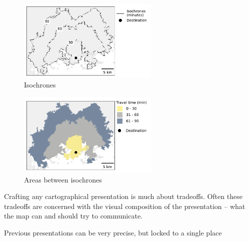 
\begin{figure}[H]
	\centering
	\includegraphics[width=0.6\textwidth]{visual/figures/ttm/isochrone_lines.pdf}
	\caption{Isochrones}
	\label{fig:isochrone lines}
\end{figure}

\begin{figure}[H]
	\centering
	\includegraphics[width=0.6\textwidth]{visual/figures/ttm/isochrone_areas.pdf}
	\caption{Areas between isochrones}
	\label{fig:isochrone areas}
\end{figure}

Crafting any cartographical presentation is much about tradeoffs.
Often these tradeoffs are concerned with the visual composition of the presentation --
what the map can and should try to communicate.

Previous presentations can be very precise, but locked to a single place

